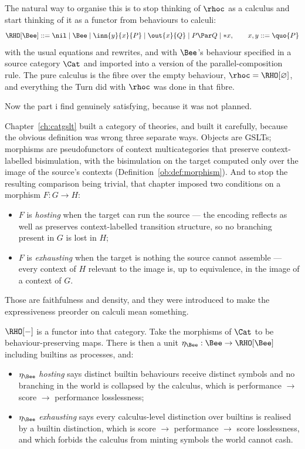 The natural way to organise this is to stop thinking of $\rhoc$ as
a calculus and start thinking of it as a functor from behaviours to
calculi:
\[
\RHO[\Bee] ::= \nil \mid \Bee \mid \inn{y}{x}{P} \mid \out{x}{Q}
\mid P \Par Q \mid *x,
\qquad x, y ::= \quo{P}
\]
with the usual equations and rewrites, and with $\Bee$'s behaviour
specified in a source category $\Cat$ and imported into a version
of the parallel-composition rule.
The pure calculus is the fibre over the empty behaviour,
$\rhoc = \RHO[\varnothing]$, and everything the Turn did with
$\rhoc$ was done in that fibre.

Now the part i find genuinely satisfying, because it was not
planned.

Chapter~\ref{ch:catgslt} built a category of theories, and built it
carefully, because the obvious definition was wrong three separate
ways.
Objects are GSLTs; morphisms are pseudofunctors of context
multicategories that preserve context-labelled bisimulation, with
the bisimulation on the target computed only over the image of the
source's contexts (Definition~\ref{ob:def:morphism}).
And to stop the resulting comparison being trivial, that chapter
imposed two conditions on a morphism $F : G \to H$:

\begin{itemize}[leftmargin=1.6em]
\item $F$ is \emph{hosting} when the target can run the source ---
the encoding reflects as well as preserves context-labelled
transition structure, so no branching present in $G$ is lost in
$H$;
\item $F$ is \emph{exhausting} when the target is nothing the
source cannot assemble --- every context of $H$ relevant to the
image is, up to equivalence, in the image of a context of $G$.
\end{itemize}

\noindent
Those are faithfulness and density, and they were introduced to
make the expressiveness preorder on calculi mean something.

$\RHO[-]$ is a functor into that category.
Take the morphisms of $\Cat$ to be behaviour-preserving maps.
There is then a unit $\eta_{\Bee} : \Bee \to \RHO[\Bee]$ including
builtins as processes, and:

\begin{itemize}[leftmargin=1.6em]
\item $\eta_{\Bee}$ \emph{hosting} says distinct builtin behaviours
receive distinct symbols and no branching in the world is collapsed
by the calculus, which is performance $\to$ score $\to$ performance
losslessness;
\item $\eta_{\Bee}$ \emph{exhausting} says every calculus-level
distinction over builtins is realised by a builtin distinction,
which is score $\to$ performance $\to$ score losslessness, and
which forbids the calculus from minting symbols the world cannot
cash.
\end{itemize}


